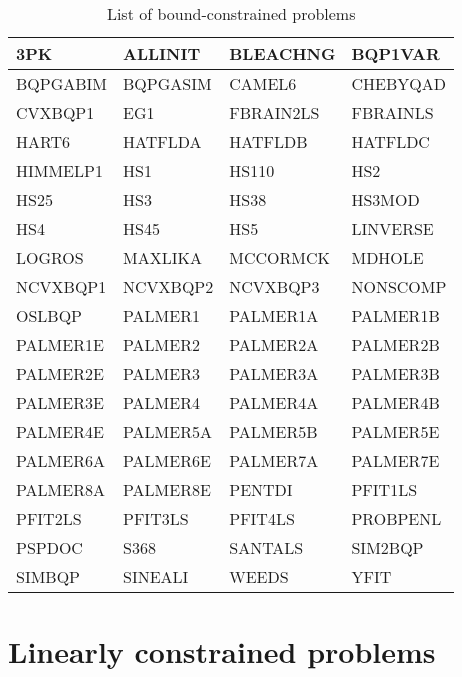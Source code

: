 \begin{longtable}{llll}
    \caption{List of bound-constrained problems}\\
    \toprule
    3PK         & ALLINIT   & BLEACHNG  & BQP1VAR\\
    \midrule
    BQPGABIM    & BQPGASIM  & CAMEL6    & CHEBYQAD\\
    \midrule
    CVXBQP1     & EG1       & FBRAIN2LS & FBRAINLS\\
    \midrule
    HART6       & HATFLDA   & HATFLDB   & HATFLDC\\
    \midrule
    HIMMELP1    & HS1       & HS110     & HS2\\
    \midrule
    HS25        & HS3       & HS38      & HS3MOD\\
    \midrule
    HS4         & HS45      & HS5       & LINVERSE\\
    \midrule
    LOGROS      & MAXLIKA   & MCCORMCK  & MDHOLE\\
    \midrule
    NCVXBQP1    & NCVXBQP2  & NCVXBQP3  & NONSCOMP\\
    \midrule
    OSLBQP      & PALMER1   & PALMER1A  & PALMER1B\\
    \midrule
    PALMER1E    & PALMER2   & PALMER2A  & PALMER2B\\
    \midrule
    PALMER2E    & PALMER3   & PALMER3A  & PALMER3B\\
    \midrule
    PALMER3E    & PALMER4   & PALMER4A  & PALMER4B\\
    \midrule
    PALMER4E    & PALMER5A  & PALMER5B  & PALMER5E\\
    \midrule
    PALMER6A    & PALMER6E  & PALMER7A  & PALMER7E\\
    \midrule
    PALMER8A    & PALMER8E  & PENTDI    & PFIT1LS\\
    \midrule
    PFIT2LS     & PFIT3LS   & PFIT4LS   & PROBPENL\\
    \midrule
    PSPDOC      & S368      & SANTALS   & SIM2BQP\\
    \midrule
    SIMBQP      & SINEALI   & WEEDS     & YFIT\\
    \bottomrule
    \end{longtable}

\section{Linearly constrained problems}
\label{sec:list-linearly-constrained-problems}

